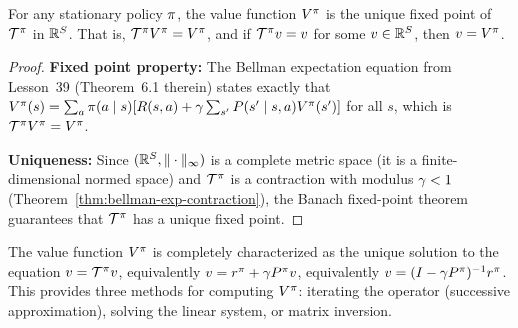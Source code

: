 \documentclass[11pt,a4paper]{article}
\begin{document}
\begin{theorem}
\label{thm:vpi-fixed-point}
For any stationary policy $\pi$, the value function $\Vpi$ is the
unique fixed point of $\mathcal{T}^\pi$ in $\mathbb{R}^S$. That is,
$\mathcal{T}^\pi V^{\pi} = V^{\pi}$, and if $\mathcal{T}^\pi v = v$ for
some $v \in \mathbb{R}^S$, then $v = V^{\pi}$.
\end{theorem}

\begin{proof}
\textbf{Fixed point property:} The Bellman expectation equation from
Lesson~39 (Theorem~6.1 therein) states exactly that
$V^{\pi}(s) = \sum_a \pi(a \mid s)[R(s,a) + \gamma \sum_{s'}
P(s' \mid s,a) V^{\pi}(s')]$ for all $s$, which is
$\mathcal{T}^\pi V^{\pi} = V^{\pi}$.

\textbf{Uniqueness:} Since $(\mathbb{R}^S, \|\cdot\|_\infty)$ is a complete
metric space (it is a finite-dimensional normed space) and
$\mathcal{T}^\pi$ is a contraction with modulus $\gamma < 1$
(Theorem~\ref{thm:bellman-exp-contraction}), the Banach fixed-point
theorem guarantees that $\mathcal{T}^\pi$ has a unique fixed point.
\end{proof}

\begin{keyresult}[title={Characterization of $\Vpi$ via Fixed Point}]
The value function $\Vpi$ is completely characterized as the unique
solution to the equation $v = \mathcal{T}^\pi v$, equivalently
$v = r^\pi + \gamma P^\pi v$, equivalently
$v = (I - \gamma P^\pi)^{-1} r^\pi$. This provides three
methods for computing $\Vpi$: iterating the operator
(successive approximation), solving the linear system, or matrix
inversion.
\end{keyresult}
\end{document}
